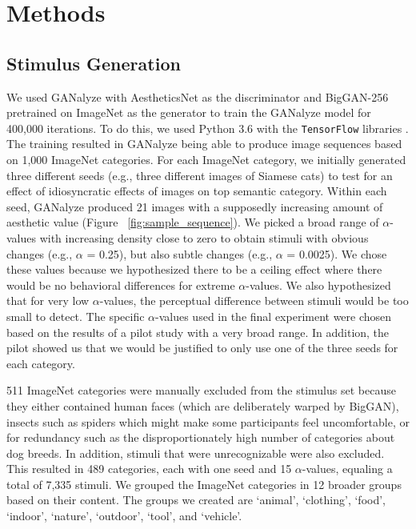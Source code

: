 \documentclass[../main.tex]{subfiles}
\begin{document}
\section{Methods}

\subsection{Stimulus Generation}
We used GANalyze with AestheticsNet \parencite{kongPhotoAestheticsRanking2016} as the discriminator and BigGAN-256 \parencite{brockLargeScaleGAN2019} pretrained on ImageNet \parencite{russakovskyImageNetLargeScale2015} as the generator to train the GANalyze model for 400,000 iterations. To do this, we used Python 3.6 with the \texttt{TensorFlow} libraries \parencite{abadi2016tensorflow}. The training resulted in GANalyze being able to produce image sequences based on 1,000 ImageNet categories. For each ImageNet category, we initially generated three different seeds (e.g., three different images of Siamese cats) to test for an effect of idiosyncratic effects of images on top semantic category. Within each seed, GANalyze produced 21 images with a supposedly increasing amount of aesthetic value (Figure ~\ref{fig:sample_sequence}). We picked a broad range of $\alpha$-values with increasing density close to zero to obtain stimuli with obvious changes (e.g., $\alpha$ = 0.25), but also subtle changes (e.g., $\alpha$ = 0.0025). We chose these values because we hypothesized there to be a ceiling effect where there would be no behavioral differences for extreme $\alpha$-values. We also hypothesized that for very low $\alpha$-values, the perceptual difference between stimuli would be too small to detect. The specific $\alpha$-values used in the final experiment were chosen based on the results of a pilot study with a very broad range. In addition, the pilot showed us that we would be justified to only use one of the three seeds for each category.
	
511 ImageNet categories were manually excluded from the stimulus set because they either contained human faces (which are deliberately warped by BigGAN), insects such as spiders which might make some participants feel uncomfortable, or for redundancy such as the disproportionately high number of categories about dog breeds. In addition, stimuli that were unrecognizable were also excluded. This resulted in 489 categories, each with one seed and 15 $\alpha$-values, equaling a total of 7,335 stimuli. We grouped the ImageNet categories in 12 broader groups based on their content. The groups we created are `animal', `clothing', `food', `indoor', `nature', `outdoor', `tool', and `vehicle'.
	
\end{document}
